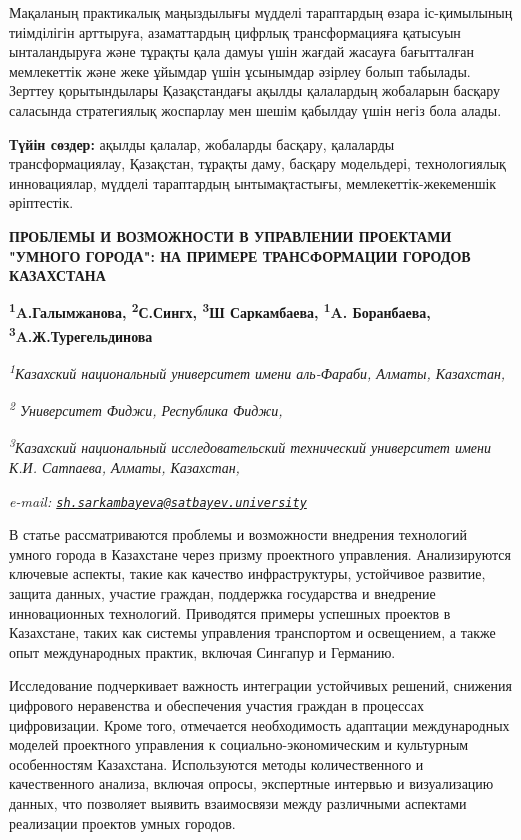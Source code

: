 {Мақаланың практикалық маңыздылығы мүдделі тараптардың өзара іс-қимылының
тиімділігін арттыруға, азаматтардың цифрлық трансформацияға қатысуын
ынталандыруға және тұрақты қала дамуы үшін жағдай жасауға бағытталған
мемлекеттік және жеке ұйымдар үшін ұсынымдар әзірлеу болып табылады.
Зерттеу қорытындылары Қазақстандағы ақылды қалалардың жобаларын басқару
саласында стратегиялық жоспарлау мен шешім қабылдау үшін негіз бола
алады.

{\bfseries Түйін сөздер:} ақылды қалалар, жобаларды басқару, қалаларды
трансформациялау, Қазақстан, тұрақты даму, басқару модельдері,
технологиялық инновациялар, мүдделі тараптардың ынтымақтастығы,
мемлекеттік-жекеменшік әріптестік.

{\bfseries ПРОБЛЕМЫ И ВОЗМОЖНОСТИ В УПРАВЛЕНИИ ПРОЕКТАМИ "УМНОГО ГОРОДА":
НА ПРИМЕРЕ ТРАНСФОРМАЦИИ ГОРОДОВ КАЗАХСТАНА}

{\bfseries \textsuperscript{1}A.Галымжанова, \textsuperscript{2}С.Сингх,
\textsuperscript{3}Ш Саркамбаева\textsuperscript{\envelope },
\textsuperscript{1}A. Боранбаева, \textsuperscript{3}A.Ж.Турегельдинова}

\emph{\textsuperscript{1}Казахский национальный университет имени
аль-Фараби, Алматы, Казахстан,}

\emph{\textsuperscript{2} Университет Фиджи, Республика Фиджи,}

\emph{\textsuperscript{3}Казахский национальный исследовательский
технический университет имени К.И. Сатпаева, Алматы, Казахстан,}

\emph{e-mail:
\href{mailto:sh.sarkambayeva@satbayev.university}{\nolinkurl{sh.sarkambayeva@satbayev.university}}}

В статье рассматриваются проблемы и возможности внедрения технологий
умного города в Казахстане через призму проектного управления.
Анализируются ключевые аспекты, такие как качество инфраструктуры,
устойчивое развитие, защита данных, участие граждан, поддержка
государства и внедрение инновационных технологий. Приводятся примеры
успешных проектов в Казахстане, таких как системы управления транспортом
и освещением, а также опыт международных практик, включая Сингапур и
Германию.

Исследование подчеркивает важность интеграции устойчивых решений,
снижения цифрового неравенства и обеспечения участия граждан в процессах
цифровизации. Кроме того, отмечается необходимость адаптации
международных моделей проектного управления к социально-экономическим и
культурным особенностям Казахстана. Используются методы количественного
и качественного анализа, включая опросы, экспертные интервью и
визуализацию данных, что позволяет выявить взаимосвязи между различными
аспектами реализации проектов умных городов.

}
